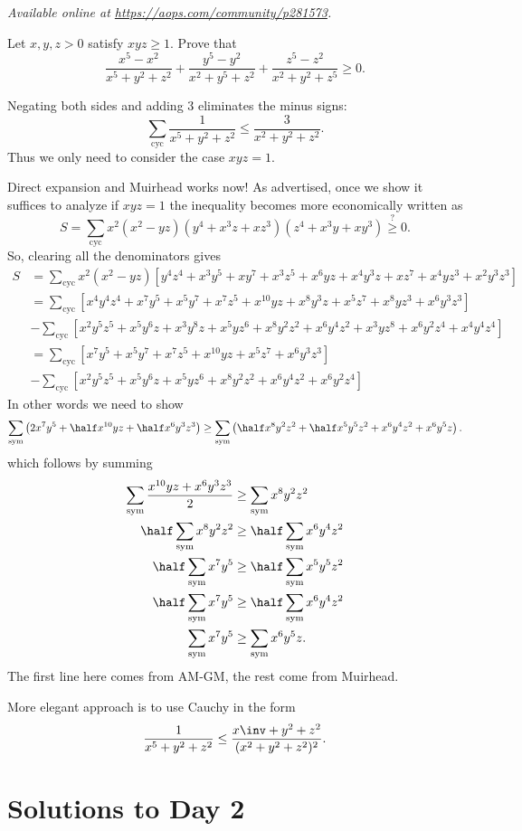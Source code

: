 \textsl{Available online at \url{https://aops.com/community/p281573}.}
\begin{mdframed}[style=mdpurplebox,frametitle={Problem statement}]
Let $x,y,z > 0$ satisfy $xyz\geq 1$. Prove that
\[ \frac { x^5-x^2 }{x^5+y^2+z^2}
  + \frac {y^5-y^2}{x^2+y^5+z^2}
  + \frac {z^5-z^2}{x^2+y^2+z^5} \geq 0. \]
\end{mdframed}
Negating both sides and adding $3$ eliminates the minus signs:
\[ \sum_{\text{cyc}} \frac{1}{x^5+y^2+z^2}
  \le \frac{3}{x^2+y^2+z^2}. \]
Thus we only need to consider the case $xyz = 1$.

Direct expansion and Muirhead works now!
As advertised, once we show it suffices to analyze if $xyz=1$
the inequality becomes more economically written as
\[ S = \sum_{\text{cyc}} x^2(x^2-yz)(y^4+x^3z+xz^3)(z^4+x^3y+xy^3)
  \overset{?}{\ge} 0. \]
So, clearing all the denominators gives
\begin{align*}
  S &= \sum_{\text{cyc}} x^2(x^2-yz)
  \left[ y^4z^4 + x^3y^5 + xy^7 + x^3z^5 + x^6yz + x^4y^3z
    + xz^7 + x^4yz^3 + x^2y^3z^3 \right] \\
  &= \sum_{\text{cyc}}
  \left[ x^4y^4z^4 + x^7y^5 + x^5y^7 + x^7z^5 + x^{10}yz + x^8y^3z
    + x^5z^7 + x^8yz^3 + x^6y^3z^3 \right] \\
  &- \sum_{\text{cyc}}
  \left[ x^2y^5z^5 + x^5y^6z + x^3y^8z + x^5yz^6 + x^8y^2z^2 + x^6y^4z^2
    + x^3yz^8 + x^6y^2z^4 + x^4y^4z^4 \right] \\
  &= \sum_{\text{cyc}}
  \left[ x^7y^5 + x^5y^7 + x^7z^5 + x^{10}yz
    + x^5z^7 + x^6y^3z^3 \right] \\
  &- \sum_{\text{cyc}}
  \left[ x^2y^5z^5 + x^5y^6z + x^5yz^6 + x^8y^2z^2 + x^6y^4z^2
    + x^6y^2z^4 \right]
\end{align*}
In other words we need to show
\[
  \sum_{\text{sym}} \left( 2x^7y^5
  +\half x^{10}yz + \half x^6y^3z^3 \right)
  \ge
  \sum_{\text{sym}} \left( \half x^8 y^2 z^2
  + \half x^5 y^5 z^2 + x^6 y^4 z^2 + x^6 y^5 z \right).
\]
which follows by summing
\begin{align*}
  \sum_{\text{sym}} \frac{x^{10} yz + x^6 y^3 z^3}{2}
    &\ge \sum_{\text{sym}} x^8 y^2 z^2 \\
  \half \sum_{\text{sym}} x^8 y^2 z^2
    &\ge \half \sum_{\text{sym}} x^6 y^4 z^2 \\
  \half \sum_{\text{sym}} x^7y^5
    &\ge \half \sum_{\text{sym}} x^5 y^5 z^2 \\
  \half \sum_{\text{sym}} x^7y^5
    &\ge \half \sum_{\text{sym}} x^6 y^4 z^2 \\
  \sum_{\text{sym}} x^7y^5
    &\ge \sum_{\text{sym}} x^6 y^5 z.
\end{align*}
The first line here comes from AM-GM,
the rest come from Muirhead.
\begin{remark*}
More elegant approach is to use Cauchy in the form
\[ \frac{1}{x^5+y^2+z^2} \le \frac{x\inv+y^2+z^2}{(x^2+y^2+z^2)^2}. \]
\end{remark*}
\pagebreak

\section{Solutions to Day 2}